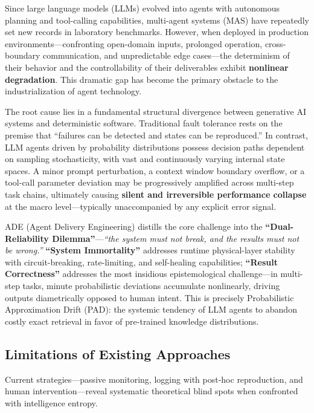 \documentclass[11pt,a4paper]{article}
\begin{document}
Since large language models (LLMs) evolved into agents with autonomous planning and tool-calling capabilities, multi-agent systems (MAS) have repeatedly set new records in laboratory benchmarks. However, when deployed in production environments---confronting open-domain inputs, prolonged operation, cross-boundary communication, and unpredictable edge cases---the determinism of their behavior and the controllability of their deliverables exhibit \textbf{nonlinear degradation}. This dramatic gap has become the primary obstacle to the industrialization of agent technology.

The root cause lies in a fundamental structural divergence between generative AI systems and deterministic software. Traditional fault tolerance rests on the premise that ``failures can be detected and states can be reproduced.'' In contrast, LLM agents driven by probability distributions possess decision paths dependent on sampling stochasticity, with vast and continuously varying internal state spaces. A minor prompt perturbation, a context window boundary overflow, or a tool-call parameter deviation may be progressively amplified across multi-step task chains, ultimately causing \textbf{silent and irreversible performance collapse} at the macro level---typically unaccompanied by any explicit error signal.

ADE (Agent Delivery Engineering) distills the core challenge into the \textbf{``Dual-Reliability Dilemma''}---\emph{``the system must not break, and the results must not be wrong.''} \textbf{``System Immortality''} addresses runtime physical-layer stability with circuit-breaking, rate-limiting, and self-healing capabilities; \textbf{``Result Correctness''} addresses the most insidious epistemological challenge---in multi-step tasks, minute probabilistic deviations accumulate nonlinearly, driving outputs diametrically opposed to human intent. This is precisely Probabilistic Approximation Drift (PAD): the systemic tendency of LLM agents to abandon costly exact retrieval in favor of pre-trained knowledge distributions.

\subsection{Limitations of Existing Approaches}
\label{sec:limitations}

Current strategies---passive monitoring, logging with post-hoc reproduction, and human intervention---reveal systematic theoretical blind spots when confronted with intelligence entropy.
\end{document}
